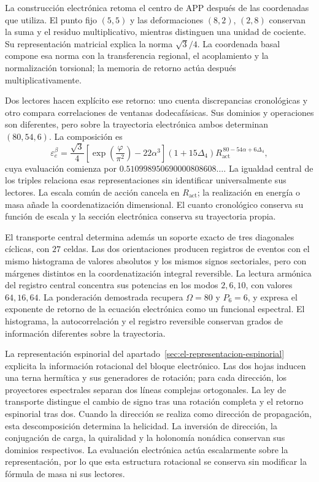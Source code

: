 La construcción electrónica retoma el centro de APP después de las coordenadas que utiliza. El punto fijo \((5,5)\) y las deformaciones \((8,2)\), \((2,8)\) conservan la suma y el residuo multiplicativo, mientras distinguen una unidad de cociente. Su representación matricial explica la norma \(\sqrt3/4\). La coordenada basal compone esa norma con la transferencia regional, el acoplamiento y la normalización torsional; la memoria de retorno actúa después multiplicativamente.

Dos lectores hacen explícito ese retorno: uno cuenta discrepancias cronológicas y otro compara correlaciones de ventanas dodecafásicas. Sus dominios y operaciones son diferentes, pero sobre la trayectoria electrónica ambos determinan \((80,54,6)\). La composición es
\[
 \varepsilon_e^\beta
 =\frac{\sqrt3}{4}
 \left[\exp\!\left(\frac{\varphi}{\pi^2}\right)-22\alpha^3\right]
 (1+15\Delta_4)
 R_{\mathrm{act}}^{\,80-54\alpha+6\Delta_4},
\]
cuya evaluación comienza por \(0.510998950690000808608\ldots\). La igualdad central de los triples relaciona esas representaciones sin identificar universalmente sus lectores. La escala común de acción cancela en \(R_{\mathrm{act}}\); la realización en energía o masa añade la coordenatización dimensional. El cuanto cronológico conserva su función de escala y la sección electrónica conserva su trayectoria propia.

El transporte central determina además un soporte exacto de tres diagonales
cíclicas, con \(27\) celdas. Las dos orientaciones producen registros de
eventos con el mismo histograma de valores absolutos y los mismos signos
sectoriales, pero con márgenes distintos
en la coordenatización integral reversible. La lectura armónica del registro central
concentra sus potencias en los modos \(2,6,10\), con valores \(64,16,64\).
La ponderación demostrada recupera \(\Omega=80\) y \(P_6=6\), y expresa
el exponente de retorno de la ecuación electrónica como un funcional
espectral. El histograma, la autocorrelación y el registro reversible
conservan grados de información diferentes sobre la trayectoria.

La representación espinorial del apartado~\ref{sec:el-representacion-espinorial}
explicita la información rotacional del bloque electrónico. Las dos hojas
inducen una terna hermítica y sus generadores de rotación; para cada dirección,
los proyectores espectrales separan dos líneas complejas ortogonales. La ley
de transporte distingue el cambio de signo tras una rotación completa y el
retorno espinorial tras dos. Cuando la dirección se realiza como dirección
de propagación, esta descomposición determina la helicidad. La inversión de
dirección, la conjugación de carga, la quiralidad y la holonomía nonádica
conservan sus dominios respectivos. La evaluación electrónica actúa
escalarmente sobre la representación, por lo que esta estructura rotacional
se conserva sin modificar la fórmula de masa ni sus lectores.

